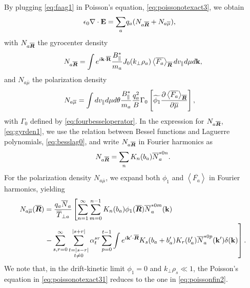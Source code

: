 By plugging \cref{eq:faag1} in Poisson's equation, \cref{eq:poissonotexact3}, we obtain
%
\begin{equation}
\begin{split}
    \epsilon_0 \nabla \cdot \mathbf E = \sum_a &q_a ( N_{a\overline{\bm{R}}}+ N_{a \overline \mu}),
\end{split}
\label{eq:poissonotexact31}
\end{equation}
%
with $N_{a \overline{\bm{R}}}$ the gyrocenter density
%
\begin{equation}
    N_{a \overline{\bm{R}}} = \int   e^{i \mathbf k \cdot \mathbf {\overline R}} \frac{B_\parallel^*}{m_a}   J_0(k_\perp \rho_a)\left<\overline{F_a}\right>_{\overline{\bm{R}}} dv_\parallel d\mu d \mathbf k,
\label{eq:gyrden1}
\end{equation}
%
and $N_{a \overline \mu}$ the polarization density
%
\begin{align}
    N_{a \overline \mu}&= \int dv_\parallel d\mu d\theta \frac{B_\parallel^*}{m_a} \frac{q_a^2}{B}\Gamma_0\left[\widetilde{\phi_1}\frac{\partial \left< \overline{F_a} \right>_{\overline{\bm{R}}}}{\partial \overline \mu}\right],
\end{align}
%
with $\Gamma_0$ defined by \cref{eq:fourbesseloperator}.
%
In the expression for $N_{a \overline{\bm{R}}}$, \cref{eq:gyrden1}, we use the relation between Bessel functions and Laguerre polynomials, \cref{eq:besslag0}, and write $N_{a \overline{\bm{R}}}$ in Fourier harmonics as
%
\begin{equation}
    N_{a \overline{\bm{R}}} =\sum_n K_n (b_a) \overline N_a^{* 0 n}.
\label{eq:gyrden}
\end{equation}
%
For the polarization density $N_{a \overline \mu}$, we expand both $\phi_1$ and $\left<\overline{F_a}\right>$ in Fourier harmonics, yielding
%
\begin{align}
    N_{a \overline \mu}(\overline{\bm{R}})&=\frac{q_a \overline N_a}{\overline T_{\perp a}}\left[\sum_{n=1}^\infty\sum_{m=0}^{n-1}K_n(b_a)\phi_1(\overline{\bm{R}}) \overline N_a^{*0m}(\mathbf k)\right.\nonumber\\
    &\left.-\sum_{s,r=0}^{\infty}\sum_{\substack{t= |s-r| \\ t \neq 0}}^{|s+r|}\alpha_t^{sr}\sum_{p=0}^{t-1}\int e^{i \mathbf k' \cdot \overline{\bm{R}}}K_s(b_a+b_a')K_r(b_a')\overline N_a^{*0p}(\mathbf k') \delta(\mathbf k) \right].
\label{eq:polden}
\end{align}
%
We note that, in the drift-kinetic limit $\phi_1=0$ and $k_\perp \rho_s \ll 1$, the Poisson's equation in \cref{eq:poissonotexact31} reduces to the one in \cref{eq:poissonfin2}.

